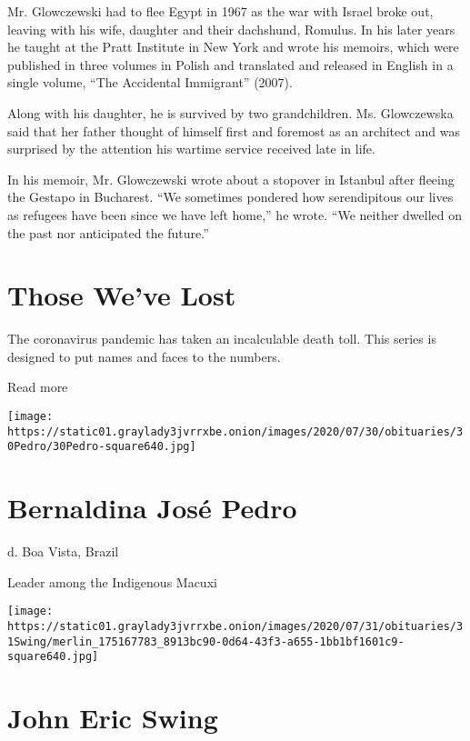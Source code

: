 Mr. Glowczewski had to flee Egypt in 1967 as the war with Israel broke
out, leaving with his wife, daughter and their dachshund, Romulus. In
his later years he taught at the Pratt Institute in New York and wrote
his memoirs, which were published in three volumes in Polish and
translated and released in English in a single volume, ``The Accidental
Immigrant'' (2007).

Along with his daughter, he is survived by two grandchildren. Ms.
Glowczewska said that her father thought of himself first and foremost
as an architect and was surprised by the attention his wartime service
received late in life.

In his memoir, Mr. Glowczewski wrote about a stopover in Istanbul after
fleeing the Gestapo in Bucharest. ``We sometimes pondered how
serendipitous our lives as refugees have been since we have left home,''
he wrote. ``We neither dwelled on the past nor anticipated the future.''

\href{https://www.nytimes3xbfgragh.onion/interactive/2020/obituaries/people-died-coronavirus-obituaries.html?action=click\&pgtype=Article\&state=default\&region=BELOW_MAIN_CONTENT\&context=covid_obits_promo}{}

\hypertarget{those-weve-lost}{%
\section{Those We've Lost}\label{those-weve-lost}}

The coronavirus pandemic has taken an incalculable death toll. This
series is designed to put names and faces to the numbers.

Read more

\texttt{[image: https://static01.graylady3jvrrxbe.onion/images/2020/07/30/obituaries/30Pedro/30Pedro-square640.jpg]}

\hypertarget{bernaldina-josuxe9-pedro}{%
\section{Bernaldina José Pedro}\label{bernaldina-josuxe9-pedro}}

d. Boa Vista, Brazil

Leader among the Indigenous Macuxi

\texttt{[image: https://static01.graylady3jvrrxbe.onion/images/2020/07/31/obituaries/31Swing/merlin\_175167783\_8913bc90-0d64-43f3-a655-1bb1bf1601c9-square640.jpg]}

\hypertarget{john-eric-swing}{%
\section{John Eric Swing}\label{john-eric-swing}}

